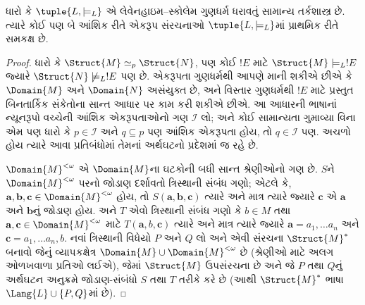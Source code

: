 \begin{thm}
ધારો કે $\tuple{L, \models_L}$ એ લેવેનહાઇમ--સ્કોલેમ ગુણધર્મ ધરાવતું
સામાન્ય તર્કશાસ્ત્ર છે. ત્યારે કોઈ પણ બે આંશિક રીતે એકરૂપ
સંરચનાઓ $\tuple{L, \models_L}$માં પ્રાથમિક રીતે સમકક્ષ છે.
\end{thm}

\begin{proof}
ધારો કે $\Struct{M} \simeq_p \Struct{N}$, પણ કોઈ $!E$ માટે
$\Struct{M} \models_L !E$ જ્યારે $\Struct{N} \not\models_L !E$ પણ છે.
એકરૂપતા ગુણધર્મથી આપણે માની શકીએ છીએ કે $\Domain{M}$ અને $\Domain{N}$
અસંયુક્ત છે, અને વિસ્તાર ગુણધર્મથી $!E$ માટે પ્રસ્તુત બિનતાર્કિક
સંકેતોના સાન્ત આધાર પર કામ કરી શકીએ છીએ. આ આધારની ભાષાનાં ન્યૂનરૂપો
વચ્ચેની આંશિક એકરૂપતાઓનો ગણ $\mathcal{I}$ લો; અને કોઈ
સામાન્યતા ગુમાવ્યા વિના એમ પણ ધારો કે $p \in \mathcal{I}$ અને $q
\subseteq p$ પણ આંશિક એકરૂપતા હોય, તો $q \in \mathcal{I}$ પણ.
અચળો હોય ત્યારે આવા પ્રતિબંધોમાં તેમનાં અર્થઘટનો પ્રદેશમાં જ રહે છે.

$\Domain{M}^{<\omega}$ એ $\Domain{M}$ના ઘટકોની બધી સાન્ત
શ્રેણીઓનો ગણ છે. $S$ને $\Domain{M}^{<\omega}$ પરનો જોડાણ દર્શાવતો
ત્રિસ્થાની સંબંધ ગણો; એટલે કે, $\mathbf{a}, \mathbf{b}, \mathbf{c}
\in \Domain{M}^{<\omega}$ હોય, તો $S(\mathbf{a}, \mathbf{b},
\mathbf{c})$ ત્યારે અને માત્ર ત્યારે જ્યારે $\mathbf{c}$ એ
$\mathbf{a}$ અને $\mathbf{b}$નું જોડાણ હોય. અને $T$ એવો ત્રિસ્થાની
સંબંધ ગણો કે $b \in M$ તથા $\mathbf{a}, \mathbf{c} \in
\Domain{M}^{<\omega}$ માટે $T(\mathbf{a}, b, \mathbf{c})$ ત્યારે અને
માત્ર ત્યારે જ્યારે $\mathbf{a} = a_1, \dots a_n$ અને
$\mathbf{c} = a_1, \dots a_n, b$. નવાં ત્રિસ્થાની વિધેયો
$P$ અને $Q$ લો અને એવી સંરચના $\Struct{M}^*$ બનાવો જેનું
વ્યાપકક્ષેત્ર $\Domain{M} \cup \Domain{M}^{<\omega}$ છે (શ્રેણીઓ માટે
અલગ ઓળખવાળા પ્રતિઓ લઈએ), જેમાં
$\Struct{M}$ ઉપસંરચના છે અને જે $P$ તથા $Q$નું અર્થઘટન અનુક્રમે
જોડાણ-સંબંધો $S$ તથા $T$ તરીકે કરે છે (આથી $\Struct{M}^*$ ભાષા
$\Lang{L} \cup \{ P, Q\}$માં છે).


\end{proof}
